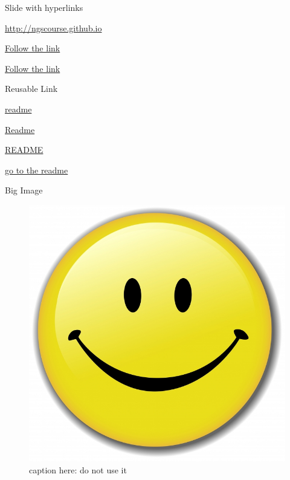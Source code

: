 \begin{frame}{Slide with hyperlinks}

\url{http://ngscourse.github.io}

\href{https://github.com}{Follow the link}

\href{https://github.com}{Follow the link}

\begin{block}{Reusable Link}

\href{https://github.com/ngscourse/ngscourse.github.io/blob/master/README.md}{readme}

\href{https://github.com/ngscourse/ngscourse.github.io/blob/master/README.md}{Readme}

\href{https://github.com/ngscourse/ngscourse.github.io/blob/master/README.md}{README}

\href{https://github.com/ngscourse/ngscourse.github.io/blob/master/README.md}{go
to the readme}

\end{block}

\end{frame}

\begin{frame}{Big Image}

\begin{figure}[htbp]
\centering
\includegraphics[width=\textwidth,height=0.8\textheight,keepaspectratio]{images/smile}
\caption{caption here: do not use it}
\end{figure}

\end{frame}

